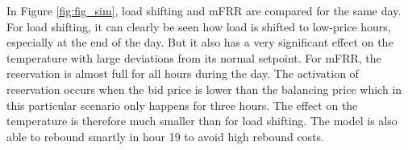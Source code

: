 In Figure \ref{fig:fig_sim}, load shifting and mFRR are compared for the same day. For load shifting, it can clearly be seen how load is shifted to low-price hours, especially at the end of the day. But it also has a very significant effect on the temperature with large deviations from its normal setpoint. For mFRR, the reservation is almost full for all hours during the day. The activation of reservation occurs when the bid price is lower than the balancing price which in this particular scenario only happens for three hours. The effect on the temperature is therefore much smaller than for load shifting. The model is also able to rebound smartly in hour 19 to avoid high rebound costs.

\begin{figure}[t]
    \centering
    \hfil

\end{figure}
